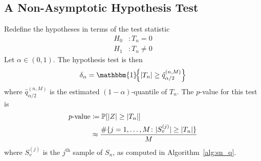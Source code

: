 \documentclass[letterpaper, reqno]{amsart}
\numberwithin{equation}{section}
\newcommand{\Prob}[1]{\mathbb{P}\mleft[#1\mright]}
\newcommand{\indic}[1]{\mathbbm{1}\!\mleft\{#1\mright\}} %
\begin{document}
\subsection{A Non-Asymptotic Hypothesis Test}
Redefine the hypotheses in terms of the test statistic
\begin{align*}
  H_0 &\colon T_n = 0 \\
  H_1 &\colon T_n \ne 0
\end{align*}
Let $\alpha \in (0, 1)$. The hypothesis test is then
\[ \delta_\alpha = \indic{|T_n| \ge \hat{q}_{\alpha/2}^{(n, M)}} \]
where $\hat{q}_{\alpha/2}^{(n, M)}$ is the estimated $(1 - \alpha)$-quantile
of $T_n$. The $p$-value for this test is
\begin{align*}
  \text{$p$-value} &\coloneqq \Prob{|Z| \ge |T_n|} \\
  &\approx \frac{\#\{j=1,\dots,M \colon |S_v^{(j)}| \ge |T_n|\}}{M}
\end{align*}
where $S_v^{(j)}$ is the $j^{\text{th}}$ sample of $S_n$, as computed in
Algorithm~\ref{alg:sn_q}.



% 

% 
% 

%
%
% 
%
\end{document}
